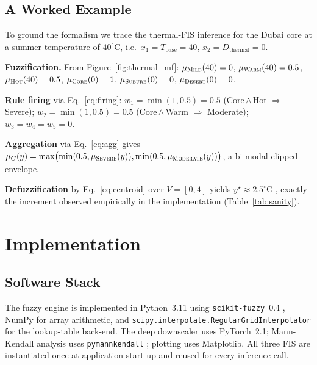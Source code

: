 \documentclass[conference]{IEEEtran}
\begin{document}
\subsection{A Worked Example}
\label{sec:worked}

To ground the formalism we trace the thermal-FIS inference for the Dubai
core at a summer temperature of \(40^{\circ}\)C, i.e.\
\(x_1=T_{\mathrm{base}}=40\), \(x_2=D_{\mathrm{thermal}}=0\).

\textbf{Fuzzification.}  From Figure~\ref{fig:thermal_mf}:
\(\mu_{\textsc{Mild}}(40)=0\),
\(\mu_{\textsc{Warm}}(40)=0.5\),
\(\mu_{\textsc{Hot}}(40)=0.5\),
\(\mu_{\textsc{Core}}(0)=1\),
\(\mu_{\textsc{Suburb}}(0)=0\),
\(\mu_{\textsc{Desert}}(0)=0\).

\textbf{Rule firing} via Eq.~\eqref{eq:firing}:
\(w_1=\min(1,0.5)=0.5\) (Core\,\(\wedge\)\,Hot \(\Rightarrow\) Severe);
\(w_2=\min(1,0.5)=0.5\) (Core\,\(\wedge\)\,Warm \(\Rightarrow\) Moderate);
\(w_3=w_4=w_5=0\).

\textbf{Aggregation} via Eq.~\eqref{eq:agg} gives
\(\mu_C(y)=\max\bigl(\min(0.5,\mu_{\textsc{Severe}}(y)),\min(0.5,\mu_{\textsc{Moderate}}(y))\bigr)\),
a bi-modal clipped envelope.

\textbf{Defuzzification} by Eq.~\eqref{eq:centroid} over \(V=[0,4]\)
yields \(y^\star\approx 2.5^{\circ}\)C ,  exactly the increment observed
empirically in the implementation (Table~\ref{tab:sanity}).

\section{Implementation}
\label{sec:implementation}

\subsection{Software Stack}

The fuzzy engine is implemented in Python~3.11 using
\texttt{scikit-fuzzy}~0.4 \cite{warner2019skfuzzy}, NumPy for array
arithmetic, and \texttt{scipy.interpolate.RegularGridInterpolator} for
the lookup-table back-end.  The deep downscaler uses PyTorch~2.1;
Mann-Kendall analysis uses \texttt{pymannkendall}
\cite{hussain2019pymannkendall}; plotting uses Matplotlib.  All three
FIS are instantiated once at application start-up and reused for every
inference call.
\end{document}

